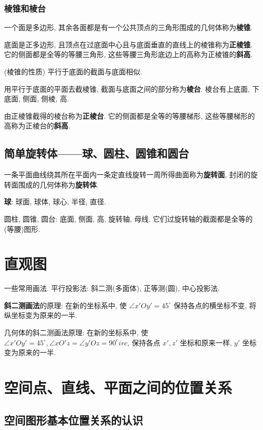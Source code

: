 \documentclass[titlepage]{ctexart}
\begin{document}
\subsubsection{棱锥和棱台}

一个面是多边形, 其余各面都是有一个公共顶点的三角形围成的几何体称为\textbf{棱锥}.

底面是正多边形, 且顶点在过底面中心且与底面垂直的直线上的棱锥称为\textbf{正棱锥}. 
它的侧面都是全等的等腰三角形, 这些等腰三角形底边上的高称为正棱锥的\textbf{斜高}.

(棱锥的性质) 平行于底面的截面与底面相似.

用平行于底面的平面去截棱锥, 截面与底面之间的部分称为\textbf{棱台}.
棱台有上底面, 下底面, 侧面, 侧棱, 高. 

由正棱锥截得的棱台称为\textbf{正棱台}. 它的侧面都是全等的等腰梯形, 这些等腰梯形的高称为正棱台的\textbf{斜高}.

\subsection{简单旋转体——球、圆柱、圆锥和圆台}

一条平面曲线绕其所在平面内一条定直线旋转一周所得曲面称为\textbf{旋转面}, 封闭的旋转面围成的几何体称为\textbf{旋转体}.

\textbf{球}: 球面, 球体, 球心, 半径, 直径.

圆柱, 圆锥, 圆台: 底面, 侧面, 高, 旋转轴, 母线. 它们过旋转轴的截面都是全等的(等腰)图形.


\section{直观图}

一些常用画法. 平行投影法: 斜二测(多面体), 正等测(圆), 中心投影法.

\textbf{斜二测画法}的原理: 在新的坐标系中, 使 $\angle x'Oy' = 45^\circ$ 保持各点的横坐标不变, 将纵坐标变为原来的一半.

几何体的斜二测画法原理: 在新的坐标系中, 使 $\angle x'Oy' = 45^\circ, \angle xO'z = \angle y'Oz = 90^circ$,
保持各点 $x', z'$ 坐标和原来一样, $y'$ 坐标变为原来的一半. 


\section{空间点、直线、平面之间的位置关系}

\subsection{空间图形基本位置关系的认识}
\end{document}
